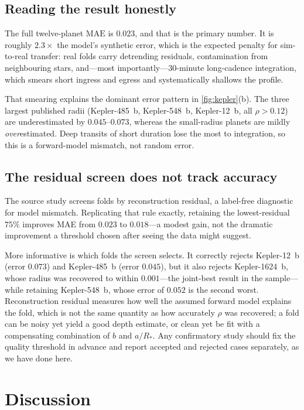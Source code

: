 \documentclass[manuscript,nonacm]{acmart}
\begin{document}
\subsection{Reading the result honestly}
The full twelve-planet $\mathrm{MAE}$ is $0.023$, and that is the primary number. It is
roughly $2.3\times$ the model's synthetic error, which is the expected penalty for
sim-to-real transfer: real folds carry detrending residuals, contamination from
neighbouring stars, and---most importantly---$30$-minute long-cadence integration, which
smears short ingress and egress and systematically shallows the profile.

That smearing explains the dominant error pattern in \cref{fig:kepler}(b). The three
largest published radii (Kepler-485~b, Kepler-548~b, Kepler-12~b, all $\rho>0.12$) are
underestimated by $0.045$--$0.073$, whereas the small-radius planets are mildly
\emph{over}estimated. Deep transits of short duration lose the most to integration, so
this is a forward-model mismatch, not random error.

\subsection{The residual screen does not track accuracy}
The source study screens folds by reconstruction residual, a label-free diagnostic for
model mismatch. Replicating that rule exactly, retaining the lowest-residual $75\%$
improves MAE from $0.023$ to $0.018$---a modest gain, not the dramatic improvement a
threshold chosen after seeing the data might suggest.

More informative is which folds the screen selects. It correctly rejects Kepler-12~b
(error $0.073$) and Kepler-485~b (error $0.045$), but it also rejects Kepler-1624~b,
whose radius was recovered to within $0.001$---the joint-best result in the sample---while
retaining Kepler-548~b, whose error of $0.052$ is the second worst. Reconstruction
residual measures how well the assumed forward model explains the fold, which is not the
same quantity as how accurately $\rho$ was recovered; a fold can be noisy yet yield a good
depth estimate, or clean yet be fit with a compensating combination of $b$ and $a/R_*$.
Any confirmatory study should fix the quality threshold in advance and report accepted and
rejected cases separately, as we have done here.

\section{Discussion}
\end{document}
